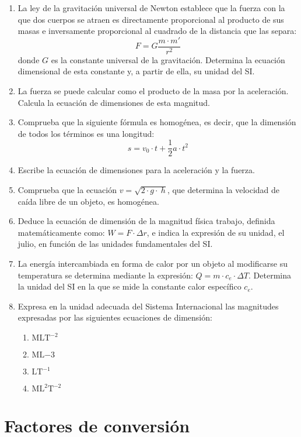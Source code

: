 \documentclass[
]{article}
\begin{document}
\begin{enumerate}
\def\labelenumi{\arabic{enumi}.}
\item
  La ley de la gravitación universal de Newton establece que la fuerza
  con la que dos cuerpos se atraen es directamente proporcional al
  producto de sus masas e inversamente proporcional al cuadrado de la
  distancia que las separa: \[F = G\frac{m \cdot m'}{r^2}\] donde \(G\)
  es la constante universal de la gravitación. Determina la ecuación
  dimensional de esta constante y, a partir de ella, su unidad del SI.
\item
  La fuerza se puede calcular como el producto de la masa por la
  aceleración. Calcula la ecuación de dimensiones de esta magnitud.
\item
  Comprueba que la siguiente fórmula es homogénea, es decir, que la
  dimensión de todos los términos es una longitud:
  \[s = v_0 \cdot t + \frac{1}{2} a \cdot t^2\]
\item
  Escribe la ecuación de dimensiones para la aceleración y la fuerza.
\item
  Comprueba que la ecuación \(v = \sqrt{2 \cdot g \cdot\ h}\), que
  determina la velocidad de caída libre de un objeto, es homogénea.
\item
  Deduce la ecuación de dimensión de la magnitud física trabajo,
  definida matemáticamente como: \(W = F \cdot \Delta r\), e indica la
  expresión de su unidad, el julio, en función de las unidades
  fundamentales del SI.
\item
  La energía intercambiada en forma de calor por un objeto al
  modificarse su temperatura se determina mediante la expresión:
  \(Q = m \cdot c_e \cdot \Delta T\). Determina la unidad del SI en la
  que se mide la constante calor específico \(c_e\).
\item
  Expresa en la unidad adecuada del Sistema Internacional las magnitudes
  expresadas por las siguientes ecuaciones de dimensión:

  \begin{enumerate}
  \def\labelenumii{\arabic{enumii}.}
  \item
    \(\mathrm{MLT^{-2}}\)
  \item
    \(\mathrm{ML{-3}}\)
  \item
    \(\mathrm{LT^{-1}}\)
  \item
    \(\mathrm{ML^2T^{-2}}\)
  \end{enumerate}
\end{enumerate}

\hypertarget{factores-de-conversion}{%
\section{Factores de conversión}\label{factores-de-conversion}}
\end{document}
